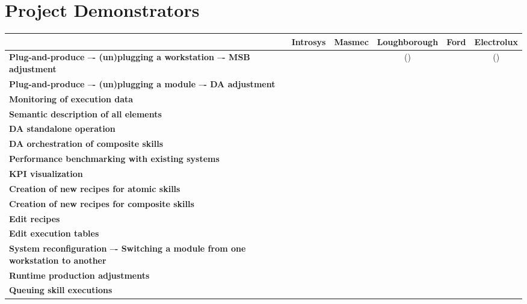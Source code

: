 \section{Project Demonstrators}
\begin{table*}
	\begin{tabular}{p{10cm}|c|c|c|c|c}
		\hline
		& \textbf{Introsys} & \textbf{Masmec} & \textbf{Loughborough} & \textbf{Ford} & \textbf{Electrolux} \\
		\hline
		\textbf{Plug-and-produce –- (un)plugging a workstation –- MSB adjustment} & \checkmark & \checkmark & (\checkmark) &  & (\checkmark) \\
		\hline
		\textbf{Plug-and-produce –- (un)plugging a module –- DA adjustment}& \checkmark &  &  &  &  \\
		\hline
		\textbf{Monitoring of execution data} & \checkmark & \checkmark & \checkmark & \checkmark & \checkmark \\
		\hline
		\textbf{Semantic description of all elements} & \checkmark & \checkmark & \checkmark & \checkmark & \checkmark \\
		\hline
		\textbf{DA standalone operation} & \checkmark & \checkmark & \checkmark &  & \checkmark \\
		\hline
		\textbf{DA orchestration of composite skills} & \checkmark &  & \checkmark &  & \checkmark \\
		\hline
		\textbf{Performance benchmarking with existing systems} & \checkmark & \checkmark &  &  &  \\
		\hline
		\textbf{KPI visualization} & \checkmark & \checkmark & \checkmark &\checkmark  & \checkmark \\
		\hline
		\textbf{Creation of new recipes for atomic skills} & \checkmark & \checkmark & \checkmark &  & \checkmark \\
		\hline
		\textbf{Creation of new recipes for composite skills} & \checkmark &  & \checkmark &  & \checkmark \\
		\hline
		\textbf{Edit recipes} & \checkmark & \checkmark & \checkmark &  & \checkmark \\
		\hline
		\textbf{Edit execution tables} & \checkmark & \checkmark & \checkmark &  & \checkmark \\
		\hline
		\textbf{System reconfiguration –- Switching a module from one workstation to another} & \checkmark &  &  &  &  \\
		\hline
		\textbf{Runtime production adjustments} & & \checkmark &  &  &  \\
		\hline
		\textbf{Queuing skill executions} &  & &  &  & \checkmark \\

\end{tabular}
\end{table*}
